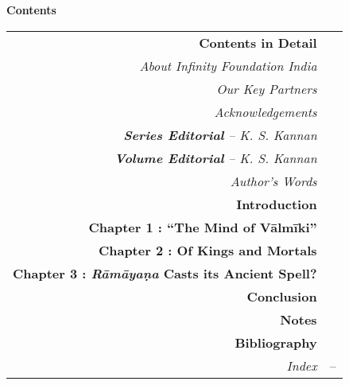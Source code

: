 \thispagestyle{empty}


\hfill{\LARGE\bfseries Contents}
\vskip 20pt

{\renewcommand{\arraystretch}{1.15}
\begin{longtable}[r]{rl@{}}
{{\bf Contents in Detail}} & \pageref{cid}\\[7pt]
{{\sl About Infinity Foundation India}} & \pageref{about}\\[7pt]
{{\sl Our Key Partners}} & \pageref{keypartners}\\[7pt]
{{\sl Acknowledgements}} & \pageref{ack2}\\[7pt]
{{\sl{\bfseries Series Editorial}  – K. S. Kannan}} & \pageref{series_editorial}\\[7pt]
{{\sl{\bfseries Volume Editorial}  – K. S. Kannan}} & \pageref{volume_editorial}\\[7pt]
{{\sl Author's Words}} & \pageref{authors-words}\\[7pt]
{{\bf Introduction}} & \pageref{introduction}\\[7pt]
{{\bfseries Chapter 1 : “The Mind of Vālmīki”}} & \pageref{chapter1}\\[7pt]
{{\bfseries Chapter 2 : Of Kings and Mortals}} & \pageref{chapter2}\\[7pt]
{{\bfseries Chapter 3 : {\sl\bfseries Rāmāyaṇa} Casts its Ancient Spell?}} & \pageref{chapter3}\\[7pt]
{{\bf Conclusion}} & \pageref{conclusion}\\[7pt]
{{\bf Notes}} & \pageref{notes}\\[7pt]
{{\bf Bibliography}} & \pageref{bibliography}\\[7pt]
{{\sl Index}} & \pageref{index}--\pageref{bookend}
\end{longtable}}
